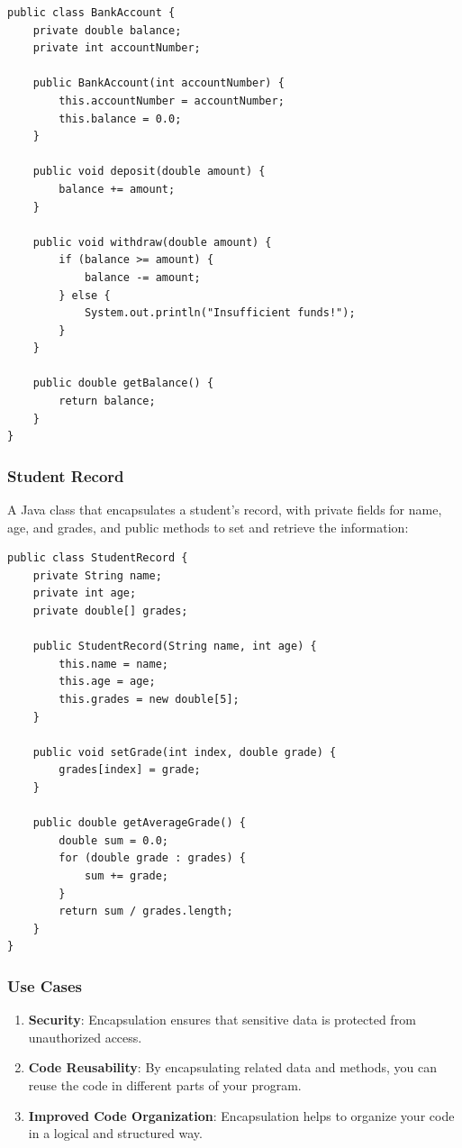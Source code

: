 \documentclass{book}
\begin{document}
\begin{verbatim}
public class BankAccount {
    private double balance;
    private int accountNumber;

    public BankAccount(int accountNumber) {
        this.accountNumber = accountNumber;
        this.balance = 0.0;
    }

    public void deposit(double amount) {
        balance += amount;
    }

    public void withdraw(double amount) {
        if (balance >= amount) {
            balance -= amount;
        } else {
            System.out.println("Insufficient funds!");
        }
    }

    public double getBalance() {
        return balance;
    }
}
\end{verbatim}

\subsubsection{Student Record}
A Java class that encapsulates a student's record, with private fields for name, age, and grades, and public methods to set and retrieve the information:

\begin{verbatim}
public class StudentRecord {
    private String name;
    private int age;
    private double[] grades;

    public StudentRecord(String name, int age) {
        this.name = name;
        this.age = age;
        this.grades = new double[5];
    }

    public void setGrade(int index, double grade) {
        grades[index] = grade;
    }

    public double getAverageGrade() {
        double sum = 0.0;
        for (double grade : grades) {
            sum += grade;
        }
        return sum / grades.length;
    }
}
\end{verbatim}

\subsubsection{Use Cases}

\begin{enumerate}
	\item \textbf{Security}: Encapsulation ensures that sensitive data is protected from unauthorized access.
	\item \textbf{Code Reusability}: By encapsulating related data and methods, you can reuse the code in different parts of your program.
	\item \textbf{Improved Code Organization}: Encapsulation helps to organize your code in a logical and structured way.
\end{enumerate}
\end{document}
